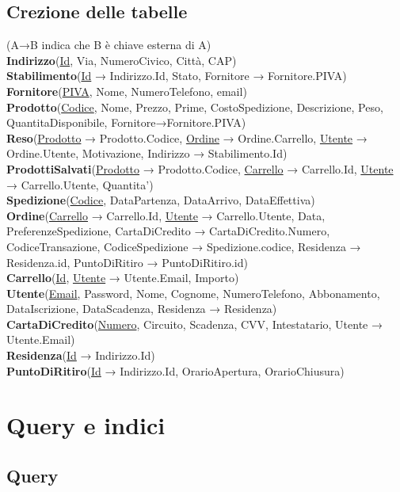 \documentclass[11pt]{article}
\begin{document}
\subsection{Crezione delle tabelle} 

(A→B indica che B è chiave esterna di A)\\
\textbf{Indirizzo}(\underline{Id}, Via, NumeroCivico, Città, CAP)\\
\textbf{Stabilimento}(\underline{Id} → Indirizzo.Id, Stato, Fornitore → Fornitore.PIVA)\\
\textbf{Fornitore}(\underline{PIVA}, Nome, NumeroTelefono, email)\\
\textbf{Prodotto}(\underline{Codice}, Nome, Prezzo, Prime, CostoSpedizione, Descrizione, Peso, QuantitaDisponibile, Fornitore→Fornitore.PIVA)\\
\textbf{Reso}(\underline{Prodotto} → Prodotto.Codice, \underline{Ordine} → Ordine.Carrello, \underline{Utente} → Ordine.Utente, Motivazione, Indirizzo → Stabilimento.Id)\\
\textbf{ProdottiSalvati}(\underline{Prodotto} → Prodotto.Codice, \underline{Carrello} → Carrello.Id, \underline{Utente} → Carrello.Utente, Quantita')\\
\textbf{Spedizione}(\underline{Codice}, DataPartenza, DataArrivo, DataEffettiva)\\
\textbf{Ordine}(\underline{Carrello} → Carrello.Id, \underline{Utente} → Carrello.Utente, Data, PreferenzeSpedizione, CartaDiCredito → CartaDiCredito.Numero, CodiceTransazione, CodiceSpedizione → Spedizione.codice, Residenza → Residenza.id, PuntoDiRitiro → PuntoDiRitiro.id)\\
\textbf{Carrello}(\underline{Id}, \underline{Utente} → Utente.Email, Importo)\\
\textbf{Utente}(\underline{Email}, Password, Nome, Cognome, NumeroTelefono, Abbonamento, DataIscrizione, DataScadenza, Residenza → Residenza)\\
\textbf{CartaDiCredito}(\underline{Numero}, Circuito, Scadenza, CVV, Intestatario, Utente → Utente.Email)\\
\textbf{Residenza}(\underline{Id} → Indirizzo.Id)\\
\textbf{PuntoDiRitiro}(\underline{Id} → Indirizzo.Id, OrarioApertura, OrarioChiusura)

\section{Query e indici}

\subsection{Query}
\end{document}
